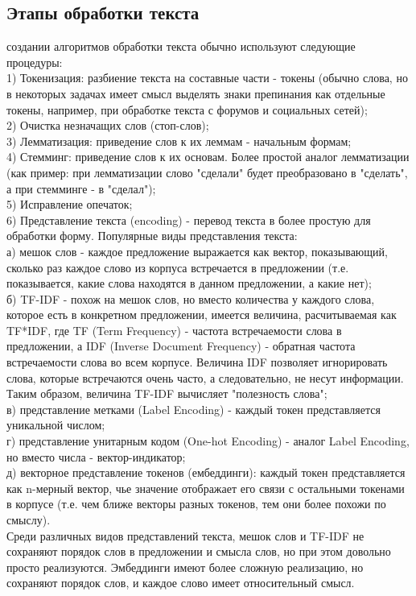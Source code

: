 \documentclass{article}
\newcommand\tab[1][1cm]{\hspace*{#1}}
\begin{document}
\subsection{Этапы обработки текста} 
 создании алгоритмов обработки текста обычно используют следующие процедуры:\\
\tab\tab1) Токенизация: разбиение текста на составные части - токены (обычно слова, но в некоторых задачах имеет смысл выделять знаки препинания как отдельные токены, например, при обработке текста с форумов и социальных сетей);\\
\tab\tab2) Очистка незначащих слов (стоп-слов);\\
\tab\tab3) Лемматизация: приведение слов к их леммам - начальным формам;\\
\tab\tab4) Стемминг: приведение слов к их основам. Более простой аналог лемматизации (как пример: при лемматизации слово "сделали" будет преобразовано в "сделать", а при стемминге - в "сделал");\\
\tab\tab5) Исправление опечаток;\\
\tab\tab6) Представление текста (encoding) - перевод текста в более простую для обработки форму. Популярные виды представления текста:\\
\tab\tab\tab а) мешок слов - каждое предложение выражается как вектор, показывающий, сколько раз каждое слово из корпуса встречается в предложении (т.е. показывается, какие слова находятся в данном предложении, а какие нет);\\ 
\tab\tab\tab б) TF-IDF - похож на мешок слов, но вместо количества у каждого слова, которое есть в конкретном предложении, имеется величина, расчитываемая как TF*IDF, где TF (Term Frequency) - частота встречаемости слова в предложении, а IDF (Inverse Document Frequency) - обратная частота встречаемости слова во всем корпусе. Величина IDF позволяет игнорировать слова, которые встречаются очень часто, а следовательно, не несут информации. Таким образом, величина TF-IDF вычисляет "полезность слова";\\
\tab\tab\tab в) представление метками (Label Encoding) - каждый токен представляется уникальной числом;\\
\tab\tab\tab г) представление унитарным кодом (One-hot Encoding) - аналог Label Encoding, но вместо числа - вектор-индикатор;\\
\tab\tab\tab д) векторное представление токенов (ембеддинги): каждый токен представляется как n-мерный вектор, чье значение отображает его связи с остальными токенами в корпусе (т.е. чем ближе векторы разных токенов, тем они более похожи по смыслу).\\ 
\tab Среди различных видов представлений текста, мешок слов и TF-IDF не сохраняют порядок слов в предложении и смысла слов, но при этом довольно просто реализуются. Эмбеддинги имеют более сложную реализацию, но сохраняют порядок слов, и каждое слово имеет относительный смысл.\\
\end{document}
